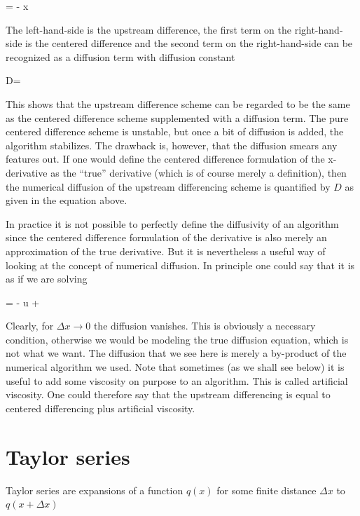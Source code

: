 \beq
{} =  -
\Delta x 
\eeq

The left-hand-side is the upstream difference, the first term on the
right-hand-side is the centered difference and the second term on the
right-hand-side can be recognized as a diffusion term with diffusion constant

\beq
D=
\eeq

This shows that the upstream difference scheme can be regarded to be the same as the centered
difference scheme supplemented with a diffusion term. The pure centered difference scheme
is unstable, but once a bit of diffusion is added, the algorithm stabilizes. The drawback is,
however, that the diffusion smears any features out. If one would define the centered difference
formulation of the x-derivative as the ``true'' derivative (which is of course merely a definition),
then the numerical diffusion of the upstream differencing scheme is
quantified by $D$ as given in the equation above. 

In practice it is not possible to perfectly define the diffusivity of an algorithm since the
centered difference formulation of the derivative is also merely an approximation of the true
derivative. But it is nevertheless a useful way of looking at the concept of numerical diffusion.
In principle one could say that it is as if we are solving

\beq
{} = - u  +
\eeq

Clearly, for $\Delta x \rightarrow 0$ the diffusion vanishes. This is obviously a necessary condition, otherwise
we would be modeling the true diffusion equation, which is not what we want. The diffusion
that we see here is merely a by-product of the numerical algorithm we
used. Note that sometimes (as we shall see below) it is useful to add
some viscosity on purpose to an algorithm. This is called artificial
viscosity. One could therefore say that the upstream differencing is equal to centered differencing plus artificial viscosity.

\section{Taylor series}

Taylor series are  expansions of a function $q(x)$ for some 
finite distance $\Delta x$ to $q(x+\Delta x)$

